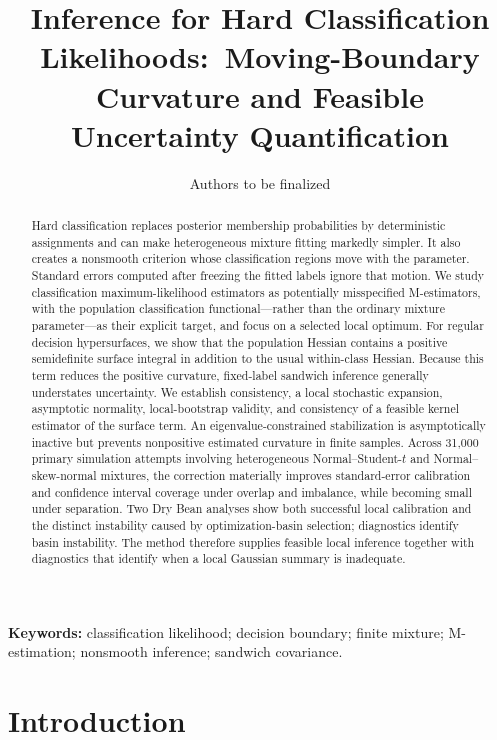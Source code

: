 \documentclass[12pt,a4paper]{article}
\title{Inference for Hard Classification Likelihoods:\
Moving-Boundary Curvature and Feasible Uncertainty Quantification}
\author{Authors to be finalized}
\date{}
\theoremstyle{definition}
\theoremstyle{remark}
\begin{document}
\maketitle

\begin{abstract}
Hard classification replaces posterior membership probabilities by
deterministic assignments and can make heterogeneous mixture fitting markedly
simpler.  It also creates a nonsmooth criterion whose classification regions
move with the parameter.  Standard errors computed after freezing the fitted
labels ignore that motion.  We study classification maximum-likelihood
estimators as potentially misspecified M-estimators, with the population
classification functional---rather than the ordinary mixture parameter---as
their explicit target, and focus on a selected local optimum.
For regular decision hypersurfaces, we show that the
population Hessian contains a positive semidefinite surface integral in
addition to the usual within-class Hessian.  Because this term reduces the
positive curvature, fixed-label sandwich inference generally understates
uncertainty.  We establish consistency, a local stochastic expansion,
asymptotic normality, local-bootstrap validity, and consistency of a feasible
kernel estimator of the surface term.  An eigenvalue-constrained
stabilization is asymptotically inactive but prevents nonpositive estimated
curvature in finite samples.  Across 31,000 primary simulation attempts involving
heterogeneous Normal--Student-$t$ and Normal--skew-normal mixtures, the
correction materially improves standard-error calibration and confidence
interval coverage under overlap and imbalance, while becoming small under
separation.  Two Dry Bean analyses show both successful local calibration and
the distinct instability caused by optimization-basin selection; diagnostics
identify basin instability.  The method therefore supplies feasible local
inference together with diagnostics that identify when a local Gaussian
summary is inadequate.
\end{abstract}

\noindent\textbf{Keywords:} classification likelihood; decision boundary;
finite mixture; M-estimation; nonsmooth inference; sandwich covariance.

\section{Introduction}
\label{sec:introduction}
\end{document}
